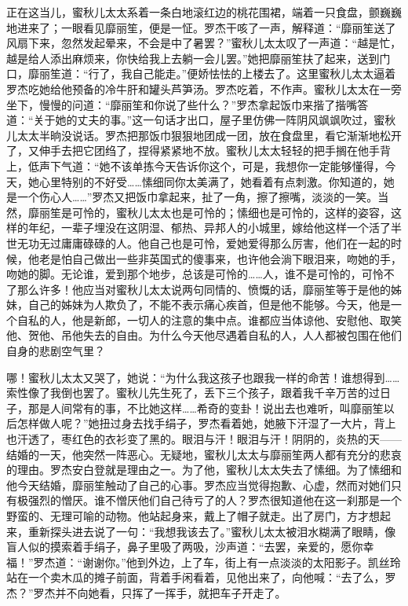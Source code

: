 \par 正在这当儿，蜜秋儿太太系着一条白地滚红边的桃花围裙，端着一只食盘，颤巍巍地进来了；一眼看见靡丽笙，便是一怔。罗杰干咳了一声，解释道：“靡丽笙送了风扇下来，忽然发起晕来，不会是中了暑罢？”蜜秋儿太太叹了一声道：“越是忙，越是给人添出麻烦来，你快给我上去躺一会儿罢。”她把靡丽笙扶了起来，送到门口，靡丽笙道：“行了，我自己能走。”便娇怯怯的上楼去了。这里蜜秋儿太太逼着罗杰吃她给他预备的冷牛肝和罐头芦笋汤。罗杰吃着，不作声。蜜秋儿太太在一旁坐下，慢慢的问道：“靡丽笙和你说了些什么？”罗杰拿起饭巾来揩了揩嘴答道：“关于她的丈夫的事。”这一句话才出口，屋子里仿佛一阵阴风飒飒吹过，蜜秋儿太太半晌没说话。罗杰把那饭巾狠狠地团成一团，放在食盘里，看它渐渐地松开了，又伸手去把它团绉了，捏得紧紧地不放。蜜秋儿太太轻轻的把手搁在他手背上，低声下气道：“她不该单拣今天告诉你这个，可是，我想你一定能够懂得，今天，她心里特别的不好受……愫细同你太美满了，她看着有点刺激。你知道的，她是一个伤心人……”罗杰又把饭巾拿起来，扯了一角，擦了擦嘴，淡淡的一笑。当然，靡丽笙是可怜的，蜜秋儿太太也是可怜的；愫细也是可怜的，这样的姿容，这样的年纪，一辈子埋没在这阴湿、郁热、异邦人的小城里，嫁给他这样一个活了半世无功无过庸庸碌碌的人。他自己也是可怜，爱她爱得那么厉害，他们在一起的时候，他老是怕自己做出一些非英国式的傻事来，也许他会淌下眼泪来，吻她的手，吻她的脚。无论谁，爱到那个地步，总该是可怜的……人，谁不是可怜的，可怜不了那么许多！他应当对蜜秋儿太太说两句同情的、愤慨的话，靡丽笙等于是他的姊妹，自己的姊妹为人欺负了，不能不表示痛心疾首，但是他不能够。今天，他是一个自私的人，他是新郎，一切人的注意的集中点。谁都应当体谅他、安慰他、取笑他、贺他、吊他失去的自由。为什么今天他尽遇着自私的人，人人都被包围在他们自身的悲剧空气里？
\par 哪！蜜秋儿太太又哭了，她说：“为什么我这孩子也跟我一样的命苦！谁想得到……索性像了我倒也罢了。蜜秋儿先生死了，丢下三个孩子，跟着我千辛万苦的过日子，那是人间常有的事，不比她这样……希奇的变卦！说出去也难听，叫靡丽笙以后怎样做人呢？”她扭过身去找手绢子，罗杰看着她，她腋下汗湿了一大片，背上也汗透了，枣红色的衣衫变了黑的。眼泪与汗！眼泪与汗！阴阴的，炎热的天——结婚的一天，他突然一阵恶心。无疑地，蜜秋儿太太与靡丽笙两人都有充分的悲哀的理由。罗杰安白登就是理由之一。为了他，蜜秋儿太太失去了愫细。为了愫细和他今天结婚，靡丽笙触动了自己的心事。罗杰应当觉得抱歉、心虚，然而对她们只有极强烈的憎厌。谁不憎厌他们自己待亏了的人？罗杰很知道他在这一刹那是一个野蛮的、无理可喻的动物。他站起身来，戴上了帽子就走。出了房门，方才想起来，重新探头进去说了一句：“我想我该去了。”蜜秋儿太太被泪水糊满了眼睛，像盲人似的摸索着手绢子，鼻子里吸了两吸，沙声道：“去罢，亲爱的，愿你幸福！”罗杰道：“谢谢你。”他到外边，上了车，街上有一点淡淡的太阳影子。凯丝玲站在一个卖木瓜的摊子前面，背着手闲看着，见他出来了，向他喊：“去了么，罗杰？”罗杰并不向她看，只挥了一挥手，就把车子开走了。
